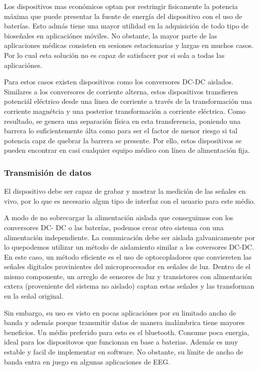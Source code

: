 \documentclass[11pt]{article}
\begin{document}
Los dispositivos mas económicos optan por restringir fisicamente la potencia máxima que puede presentar la fuente de energía del dispositivo con el uso de baterías. Esto admás tiene una mayor utilidad en la adquisición de todo tipo de bioseñales en aplicaciónes móviles. No obstante, la mayor parte de las aplicaciones médicas consisten en sesiones estacionarias y largas en muchos casos. Por lo cual esta solución no es capaz de satisfacer por si sola a todas las aplicaciónes.

Para estos casos existen dispositivos como los conversores DC-DC aislados. Similares a los conversores de corriente alterna, estos dispositivos transfieren potenciál eléctrico desde una linea de corriente a través de la transformación una corriente magnétcia y una posterior transformación a corriente eléctrica. Como resultado, se genera una separación física en esta transferencia, poniendo una barrera lo suficientemente álta como para ser el factor de menor riesgo si tal potencia capz de quebrar la barrera se presente. Por ello, estos dispositivos se pueden encontrar en casi cualquier equipo médico con línea de alimentación fija.

\subsubsection{Transmisión de datos}
\label{sec:orgc115ff7}
El dispositivo debe ser capaz de grabar y mostrar la medición de las señales en vivo, por lo que es necesario algun tipo de interfaz con el usuario para este médio.

A modo de no sobrecargar la alimentación aislada que conseguimos con los conversores DC- DC o las baterías, podemos crear otro sistema con una alimentación independiente. La comunicación debe ser aislada galvanicamente por lo quepodemos utilizar un método de aislamiento similar a los coversores DC-DC. En este caso, un método eficiente es el uso de optocopladores que conviereten las señales digitales provinientes del microprocesador en señales de luz. Dentro de el mismo componente, un arreglo de sensores de luz y transistores con alimentación extera (proveniente del sistema no aislado) captan estas señales y las transforman en la señal original.

Sin embargo, su uso es visto en pocas aplicaciónes por su limitado ancho de banda y además porque transmitir datos de manera inalámbrica tiene mayores beneficios. Un médio preferido para esto es el bluetooth. Consume poca energia, ideal para los dispositovos que funcionan en base a baterias. Además es muy estable y facil de implementar en software. No obstante, su límite de ancho de banda entra en juego en algunas aplicaciones de EEG.
\end{document}
